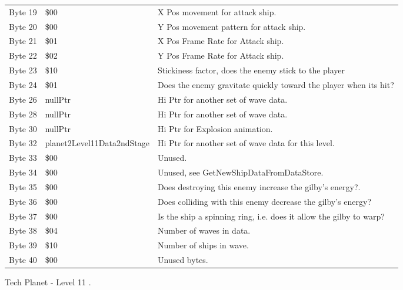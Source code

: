 \begin{figure}[H]
{\begin{adjustbox}{width=12cm}
\begin{tabular}{lll}
 Byte 19 & \$00                        & X Pos movement for attack ship.                                    \\
 Byte 20 & \$00                        & Y Pos movement pattern for attack ship.                            \\
 Byte 21 & \$01                        & X Pos Frame Rate for Attack ship.                                  \\
 Byte 22 & \$02                        & Y Pos Frame Rate for Attack ship.                                  \\
 Byte 23 & \$10                        & Stickiness factor, does the enemy stick to the player              \\
 Byte 24 & \$01                        & Does the enemy gravitate quickly toward the player when its hit?   \\
 Byte 26 & nullPtr                    & Hi Ptr for another set of wave data.                               \\
 Byte 28 & nullPtr                    & Hi Ptr for another set of wave data.                               \\
 Byte 30 & nullPtr                    & Hi Ptr for Explosion animation.                                    \\
 Byte 32 & planet2Level11Data2ndStage & Hi Ptr for another set of wave data for this level.                \\
 Byte 33 & \$00                        & Unused.                                                            \\
 Byte 34 & \$00                        & Unused, see GetNewShipDataFromDataStore.                           \\
 Byte 35 & \$00                        & Does destroying this enemy increase the gilby's energy?.           \\
 Byte 36 & \$00                        & Does colliding with this enemy decrease the gilby's energy?        \\
 Byte 37 & \$00                        & Is the ship a spinning ring, i.e. does it allow the gilby to warp? \\
 Byte 38 & \$04                        & Number of waves in data.                                           \\
 Byte 39 & \$10                        & Number of ships in wave.                                           \\
 Byte 40 & \$00                        & Unused bytes.                                                      \\
\bottomrule
\end{tabular}

  \end{adjustbox}

  }\caption*{Tech Planet - Level 11
.}
\end{figure}


